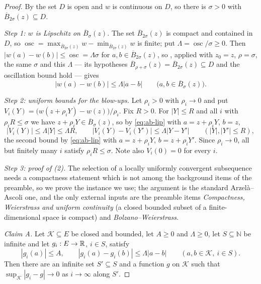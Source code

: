 \begin{proof}
By  the set $D$ is open and $w$ is continuous on $D$,
so there is $\sigma>0$ with $\overline B_{2\sigma}(z)\subseteq D$.

\emph{Step 1: $w$ is Lipschitz on $\overline B_\sigma(z)$.}
The set $\overline B_{2\sigma}(z)$ is compact and contained in $D$, so
$\operatorname{osc}=\max_{\overline B_{2\sigma}(z)}w
 -\min_{\overline B_{2\sigma}(z)}w$ is finite; put
$\Lambda=\operatorname{osc}/\sigma\ge0$. Then
$|w(a)-w(b)|\le\operatorname{osc}=\Lambda\sigma$ for
$a,b\in\overline B_{2\sigma}(z)$, so , applied
with $z_0=z$, $\rho=\sigma$, the same $\sigma$ and this $\Lambda$ — its
hypotheses $\overline B_{\rho+\sigma}(z)=\overline B_{2\sigma}(z)\subseteq D$ and
the oscillation bound hold — gives
\begin{equation}\label{eq:ab-lip}
  |w(a)-w(b)|\le\Lambda|a-b|\qquad\bigl(a,b\in\overline B_\sigma(z)\bigr).
\end{equation}

\emph{Step 2: uniform bounds for the blow-ups.}
Let $\rho_i>0$ with $\rho_i\to0$ and put
$V_i(Y)=\bigl(w(z+\rho_iY)-w(z)\bigr)/\rho_i$. Fix $R>0$. For $|Y|\le R$ and all
$i$ with $\rho_iR\le\sigma$ we have $z+\rho_iY\in\overline B_\sigma(z)$, so by
\eqref{eq:ab-lip} with $a=z+\rho_iY$, $b=z$,
\begin{equation}\label{eq:ab-unif}
  |V_i(Y)|\le\Lambda|Y|\le\Lambda R,
  \qquad
  |V_i(Y)-V_i(Y')|\le\Lambda|Y-Y'|\qquad(|Y|,|Y'|\le R),
\end{equation}
the second bound by \eqref{eq:ab-lip} with $a=z+\rho_iY$, $b=z+\rho_iY'$. Since
$\rho_i\to0$, all but finitely many $i$ satisfy $\rho_iR\le\sigma$. Note also
$V_i(0)=0$ for every $i$.

\emph{Step 3: proof of (2).}
The selection of a locally uniformly convergent subsequence needs a compactness
statement which is not among the background items of the preamble, so we prove
the instance we use; the argument is the standard Arzel\`a--Ascoli one, and the
only external inputs are the preamble items \emph{Compactness, Weierstrass and
uniform continuity} (a closed bounded subset of a finite-dimensional space is
compact) and \emph{Bolzano--Weierstrass}.

\emph{Claim A.} Let $\mathcal K\subseteq E$ be closed and bounded, let $A\ge0$
and $\Lambda\ge0$, let $S\subseteq\mathbb N$ be infinite and let $g_i:E\to\mathbb{R}$,
$i\in S$, satisfy
\[
  |g_i(a)|\le A,\qquad|g_i(a)-g_i(b)|\le\Lambda|a-b|
  \qquad(a,b\in\mathcal K,\ i\in S).
\]
Then there are an infinite set $S'\subseteq S$ and a function $g$ on
$\mathcal K$ such that $\sup_{\mathcal K}|g_i-g|\to0$ as $i\to\infty$ along
$S'$.


\end{proof}
